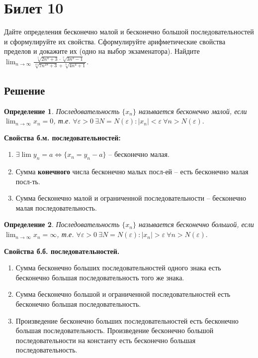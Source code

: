 \documentclass[a4paper,12pt]{article}
\newtheorem*{defi}{Определение}
\newcommand{\eps}{\varepsilon}
\begin{document}
    \section*{Билет 10}
    
    Дайте определения бесконечно малой и бесконечно большой последовательностей и сформулируйте их свойства. Сформулируйте арифметические свойства пределов и докажите их (одно на
выбор экзаменатора). Найдите $\displaystyle \lim_{n\rightarrow \infty} 
            \frac{
                   \sqrt[5]{2n^4 + 3} \cdot 
                   \sqrt[7]{3n^3 - 1}
                 }
                 {
                   \sqrt[15]{7n^{18} + 3} + 
                   \sqrt[3]{4n^4 + 1}
                 }.$
    
    \subsection*{Решение}
    
    \begin{defi} Последовательность $ \{ x_ n \} $ называется бесконечно малой, 
        если $\displaystyle \lim_{n \rightarrow \infty} x_n = 0$, т.е. 
        $\forall \eps > 0\ \exists N = N(\eps):|x_n| < \eps\ \forall n > N(\eps).$
    \end{defi}

    \textbf{Свойства б.м. последовательностей:}
        \begin{enumerate}
            \item $\exists \lim y_n = a \Leftrightarrow \{x_n = y_n - a\}$ -- бесконечно малая.
            \item Сумма \textbf{конечного} числа бесконечно малых посл-ей -- есть бесконечно малая посл-ть.
            \item Сумма бесконечно малой и ограниченной последовательности -- бесконечно малая последовательность.
        \end{enumerate}
    
    \begin{defi} Последовательность $ \{ x_ n \} $ называется бесконечно большой, 
        если $\displaystyle \lim_{n \rightarrow \infty} x_n = \infty$, т.е. 
        $\forall \eps > 0\ \exists N = N(\eps):|x_n| > \eps\ \forall n > N(\eps).$
    \end{defi}
    \textbf{Свойства б.б. последовательностей.}
        \begin{enumerate}
            \item Сумма бесконечно больших последовательностей одного знака есть бесконечно большая последовательность того же знака.
            \item Сумма бесконечно большой и ограниченной последовательностей есть бесконечно большая последовательность.
            \item Произведение бесконечно больших последовательностей есть бесконечно большая последовательность. Произведение бесконечно большой последовательности на константу есть бесконечно большая последовательность.
        \end{enumerate}
\end{document}
